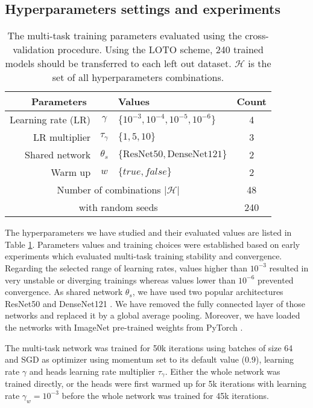 \subsection{Hyperparameters settings and experiments}
\label{ssec:mtask:exp:parameters} 

\begin{table}
    \centering
    \begin{tabular}{|rc|l|c|}
        \hline
        \multicolumn{2}{|c|}{Parameters} & Values & Count \\
        \hline
        Learning rate (LR) & $\gamma$ & $\{10^{-3}, 10^{-4}, 10^{-5}, 10^{-6}\}$ & 4 \\
        LR multiplier & $\tau_\gamma$ & $\{1, 5, 10\}$ & 3 \\
        Shared network & $\theta_s$ & $\{\text{ResNet50}, \text{DenseNet121}\}$ & 2 \\
        Warm up & $w$ & $\{true, false\}$ & 2 \\
        \hline
        \multicolumn{3}{|c|}{Number of combinations $\left|\mathcal{H}\right|$} & 48 \\
        \hline
        \multicolumn{3}{|c|}{with random seeds} & 240 \\
        \hline
    \end{tabular}
    \caption{The multi-task training parameters evaluated using the cross-validation procedure. Using the LOTO scheme, 240 trained models should be transferred to each left out dataset. $\mathcal{H}$ is the set of all hyperparameters combinations.}
    \label{tab:mtask:results:parameters}
\end{table}

The hyperparameters we have studied and their evaluated values are listed in Table \ref{tab:mtask:results:parameters}. Parameters values and training choices were established based on early experiments which evaluated multi-task training stability and convergence. Regarding the selected range of learning rates, values higher than $10^{-3}$ resulted in very unstable or diverging trainings whereas values lower than $10^{-6}$ prevented convergence. As shared network $\theta_s$, we have used two popular architectures ResNet50 \cite{he2016deep} and DenseNet121 \cite{huang2017densely}. We have removed the fully connected layer of those networks and replaced it by a global average pooling. Moreover, we have loaded the networks with ImageNet pre-trained weights from PyTorch \cite{paszke2019pytorch}.

The multi-task network was trained for 50k iterations using batches of size 64 and SGD as optimizer using momentum set to its default value (\ie $0.9$), learning rate $\gamma$ and heads learning rate multiplier $\tau_\gamma$. Either the whole network was trained directly, or the heads were first warmed up for 5k iterations with learning rate $\gamma_w = 10^{-3}$ before the whole network was trained for 45k iterations.

